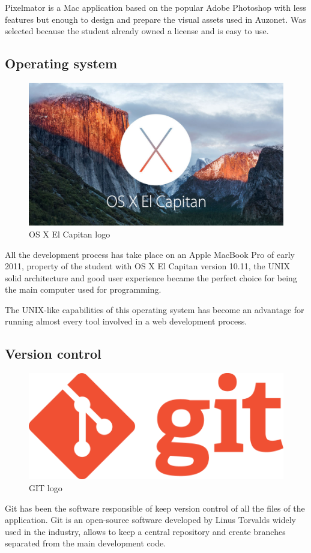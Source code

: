 \documentclass{DeustoFDP}
\begin{document}
Pixelmator is a Mac application based on the popular Adobe Photoshop with less features but enough to design and prepare the visual assets used in Auzonet. Was selected because the student already owned a license and is easy to use.

\subsection{Operating system}
\begin{figure}[h]
\centering
\includegraphics[width=0.7\linewidth]{fig/osxelcapitan}
\caption[OS X El Capitan logo]{OS X El Capitan logo}
\label{fig:osxelcapitan}
\end{figure}


All the development process has take place on an Apple MacBook Pro of early 2011, property of the student with OS X El Capitan version 10.11, the UNIX solid architecture and good user experience became the perfect choice for being the main computer used for programming.

The UNIX-like capabilities of this operating system has become an advantage for running almost every tool involved in a web development process.
\subsection{Version control}
\begin{figure}[h]
\centering
\includegraphics[width=0.5\linewidth]{fig/git}
\caption[GIT logo]{GIT logo}
\label{fig:git}
\end{figure}

Git \cite{git} has been the software responsible of keep version control of all the files of the application. Git is an open-source software developed by Linus Torvalds widely used in the industry, allows to keep a central repository and create branches separated from the main development code.
\end{document}
